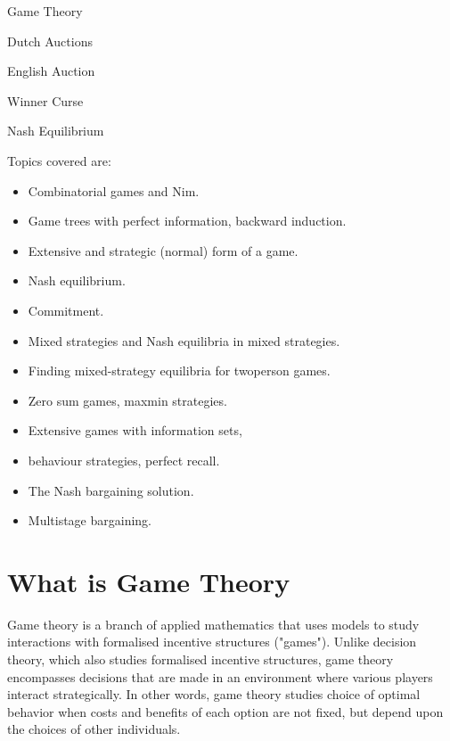 Game Theory

Dutch Auctions

English Auction

Winner Curse

Nash Equilibrium

Topics covered are:
\begin{multicols}{2}
\begin{itemize}
\item Combinatorial games and Nim.

\item Game trees with perfect information, backward induction.

\item Extensive and strategic (normal) form of a game.

\item Nash equilibrium.

\item Commitment.

\item Mixed strategies and Nash equilibria in mixed strategies.

\item Finding mixed-strategy equilibria for twoperson games.

\item Zero sum games, maxmin strategies.

\item Extensive games with information sets,

\item behaviour strategies, perfect recall.

\item The Nash bargaining solution.

\item Multistage bargaining.
\end{itemize}

\end{multicols}

\section{What is Game Theory}

Game theory is a branch of applied mathematics that uses models to study interactions with formalised incentive structures ("games"). 
Unlike decision theory, which also studies formalised incentive structures, game theory encompasses decisions that are made in an environment where various players interact strategically.
In other words, game theory studies choice of optimal behavior when costs and benefits of each option are not fixed, but depend upon the choices of other individuals.


